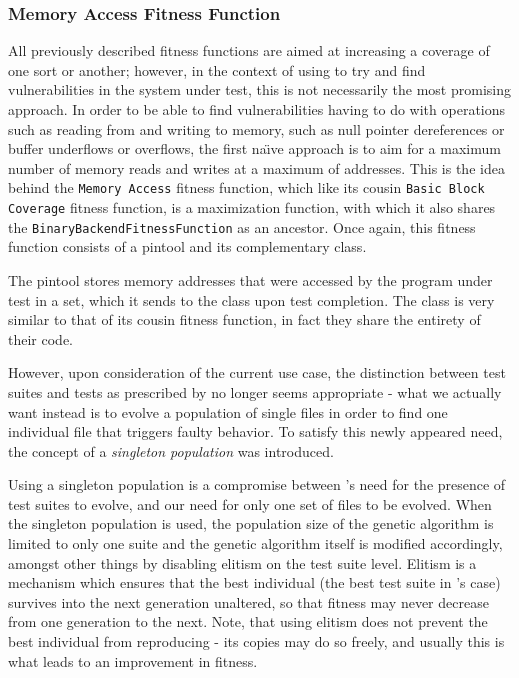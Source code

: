 \subsubsection{Memory Access Fitness Function}
\label{sec:memcov}
All previously described fitness functions are aimed at increasing a coverage of one sort or another; however,
in the context of using \xmlmate to try and find vulnerabilities in the system under test, this is not
necessarily the most promising approach. In order to be able to find vulnerabilities having to do with
operations such as reading from and writing to memory, such as null pointer dereferences or buffer underflows
or overflows, the first na\"\i{}ve approach is to aim for a maximum number of memory reads and writes at a
maximum of addresses. This is the idea behind the \texttt{Memory Access} fitness function, which like its
cousin \texttt{Basic Block Coverage} fitness function, is a maximization function, with which it also shares
the \texttt{BinaryBackendFitnessFunction} as an ancestor. Once again, this fitness function consists of a
pintool and its complementary \java class. 

The pintool stores memory addresses that were accessed by the program under test in a set, which it sends to
the \java class upon test completion.
The \java class is very similar to that of its cousin fitness function, in fact they share the entirety of
their code.

However, upon consideration of the current use case, the distinction between test suites and tests as
prescribed by \evosuite no longer seems appropriate - what we actually want instead is to evolve a population
of single \xml files in order to find one individual file that triggers faulty behavior. To satisfy this newly
appeared need, the concept of a \emph{singleton population} was introduced.

Using a singleton population is a compromise between \evosuite's need for the presence of test suites to
evolve, and our need for only one set of files to be evolved. When the singleton population is used, the
population size of the genetic algorithm is limited to only one suite and the genetic algorithm itself is
modified accordingly, amongst other things by disabling elitism on the test suite level. Elitism is a
mechanism which ensures that the best individual (the best test suite in \evosuite's case) survives into the
next generation unaltered, so that fitness may never decrease from one generation to the next. Note,
that using elitism does not prevent the best individual from reproducing - its copies may do so freely, and
usually this is what leads to an improvement in fitness. 

